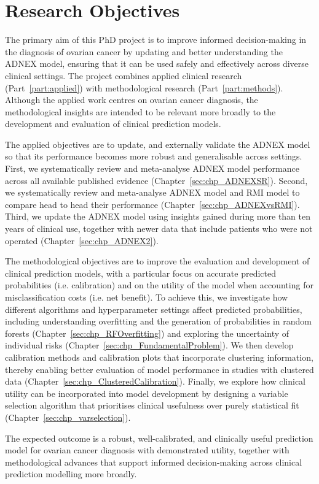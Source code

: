\chapter{Research Objectives}
\label{sec:research_objectives}

The primary aim of this PhD project is to improve informed decision-making in the diagnosis of ovarian cancer by updating and better understanding the \gls{ADNEX} model, ensuring that it can be used safely and effectively across diverse clinical settings. The project combines applied clinical research (Part~\ref{part:applied}) with methodological research (Part~\ref{part:methods}). Although the applied work centres on ovarian cancer diagnosis, the methodological insights are intended to be relevant more broadly to the development and evaluation of clinical prediction models.

The applied objectives are to update, and externally validate the \gls{ADNEX} model so that its performance becomes more robust and generalisable across settings. First, we systematically review and meta-analyse \gls{ADNEX} model performance across all available published evidence (Chapter~\ref{sec:chp_ADNEXSR}). Second, we systematically review and meta-analyse \gls{ADNEX} model and \gls{RMI} model to compare head to head their performance (Chapter~\ref{sec:chp_ADNEXvsRMI}). Third, we update the \gls{ADNEX} model using insights gained during more than ten years of clinical use, together with newer data that include patients who were not operated (Chapter~\ref{sec:chp_ADNEX2}).

The methodological objectives are to improve the evaluation and development of clinical prediction models, with a particular focus on accurate predicted probabilities (i.e. calibration) and on the utility of the model when accounting for misclassification costs (i.e. net benefit). To achieve this, we investigate how different algorithms and hyperparameter settings affect predicted probabilities, including understanding overfitting and the generation of probabilities  in random forests (Chapter~\ref{sec:chp_RFOverfitting}) and exploring the uncertainty of individual risks (Chapter~\ref{sec:chp_FundamentalProblem}). We then develop calibration methods and calibration plots that incorporate clustering information, thereby enabling better evaluation of model performance in studies with clustered data (Chapter~\ref{sec:chp_ClusteredCalibration}). Finally, we explore how clinical utility can be incorporated into model development by designing a variable selection algorithm that prioritises clinical usefulness over purely statistical fit (Chapter~\ref{sec:chp_varselection}).

The expected outcome is a robust, well-calibrated, and clinically useful prediction model for ovarian cancer diagnosis with demonstrated utility, together with methodological advances that support informed decision-making across clinical prediction modelling more broadly.
